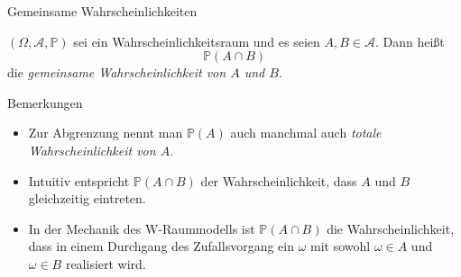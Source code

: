 \documentclass[
  8pt,
  ignorenonframetext,
]{beamer}
\providecommand{\tightlist}{%
  \setlength{\itemsep}{0pt}\setlength{\parskip}{0pt}}
\begin{document}
\begin{frame}{Gemeinsame Wahrscheinlichkeiten}
\protect\hypertarget{gemeinsame-wahrscheinlichkeiten}{}
\small
\begin{definition}
\justifying
$(\Omega, \mathcal{A}, \mathbb{P})$ sei ein Wahrscheinlichkeitsraum und es seien
$A,B \in \mathcal{A}$. Dann heißt
\begin{equation}
\mathbb{P}(A \cap B)
\end{equation}
die \textit{gemeinsame Wahrscheinlichkeit von $A$ und $B$}.
\end{definition}


Bemerkungen

\begin{itemize}
\tightlist
\item
  Zur Abgrenzung nennt man \(\mathbb{P}(A)\) auch manchmal auch
  \emph{totale Wahrscheinlichkeit von \(A\)}.
\item
  Intuitiv entspricht \(\mathbb{P}(A \cap B)\) der Wahrscheinlichkeit,
  dass \(A\) und \(B\) gleichzeitig eintreten.
\item
  In der Mechanik des W-Raummodells ist \(\mathbb{P}(A \cap B)\) die
  Wahrscheinlichkeit, dass in einem Durchgang des Zufallsvorgang ein
  \(\omega\) mit sowohl \(\omega \in A\) und \(\omega \in B\) realisiert
  wird.
\end{itemize}
\end{frame}
\end{document}
